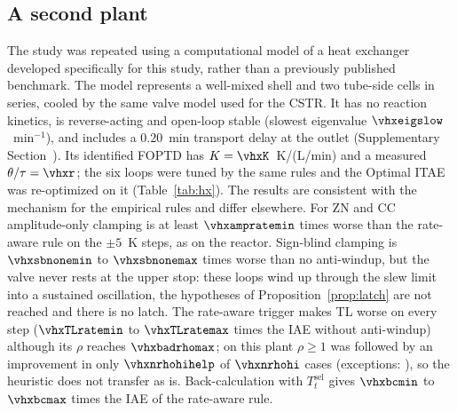 \subsection{A second plant}
\label{subsec:hx}
The study was repeated using a computational model of a heat exchanger developed specifically for this study, rather than
a previously published benchmark. The model represents a well-mixed shell and two tube-side cells in series, cooled by the same valve model used for the CSTR. It has no reaction
kinetics, is reverse-acting and open-loop stable (slowest eigenvalue $\vhxeigslow$~min$^{-1}$), and includes a
$0.20$~min transport delay at the outlet (Supplementary Section~). Its identified FOPTD has $K = \vhxK$~K/(L/min) and a measured $\theta/\tau = \vhxr$; the six loops were tuned by the same rules and the Optimal ITAE was re-optimized
on it (Table~\ref{tab:hx}). The results are consistent with the mechanism for the empirical rules and differ elsewhere. For ZN and CC amplitude-only clamping is at least $\vhxampratemin$ times worse than the rate-aware
rule on the $\pm 5$~K steps, as on the reactor.
Sign-blind clamping is $\vhxsbnonemin$ to
$\vhxsbnonemax$ times worse than no anti-windup, but the valve never rests at the upper stop: these loops wind up through the slew limit into a sustained oscillation, the hypotheses of Proposition~\ref{prop:latch} are not reached and there is no latch. The rate-aware trigger makes TL worse on every step ($\vhxTLratemin$ to $\vhxTLratemax$ times the IAE without anti-windup) although its $\rho$ reaches $\vhxbadrhomax$; on this plant $\rho \ge 1$ was followed by an improvement in only $\vhxnrhohihelp$ of $\vhxnrhohi$ cases (exceptions: \vhxbadloops{}), so the heuristic does not transfer as is. Back-calculation with $T_t^{\mathrm{sel}}$ gives $\vhxbcmin$ to $\vhxbcmax$ times the IAE of the rate-aware rule.

